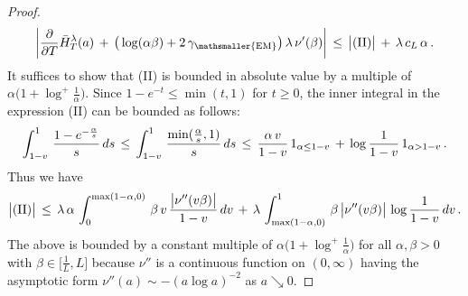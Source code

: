 \documentclass[10pt]{article}
\numberwithin{equation}{section}
\theoremstyle{definition}
\begin{document}
\begin{proof}
\begin{align*}
\bigg| \frac{\partial}{\partial T}\bar{H}_{T}^{\lambda}(a)\,+\,\big( \log (\alpha \beta)+2\,\gamma_{\mathsmaller{\textup{EM}}}    \big)\,\lambda \,\nu'(\beta)   \bigg|\,\leq  \, \big|\textup{(II)}\big|\,+\, \lambda \,c_L\, \alpha \,.
\end{align*}
It suffices to show that (II) is bounded in absolute value by a multiple of $\alpha \big(1+\log^+ \frac{1}{\alpha}\big)$.  Since $1-e^{-t}\leq \min(t,1)  $ for $t\geq 0$, the inner integral in the expression (II) can be bounded as follows:
\begin{align*}
\int_{1-v }^{1  } \,\frac{1-e^{-\frac{\alpha}{s}}  }{s}  \, ds\,\leq \,  \int_{1-v }^{1  }\,\frac{ \textup{min}(\frac{\alpha}{s},1)  }{s} \,  ds   \,\leq \,  \frac{ \alpha  \,v}{1-v }\, 1_{\alpha\leq 1-v  } \,+\,\log \frac{1}{1-v}\,1_{\alpha >1-v }  \,.
\end{align*}
Thus we have 
\begin{align*}
 \big|\textup{(II)}\big|\,\leq \,  \lambda \,\alpha \, \int_0^{\textup{max}(1-\alpha,0)} \,\beta \, v\, \frac{\big|\nu'' ( v \beta)\big|}{1-v} \,   dv \,+\, \lambda \,\int^1_{\textup{max}(1-\alpha,0)} \,\beta \,\big|\nu'' ( v \beta)\big| \,\log\frac{1}{1-v}\,dv\,.
\end{align*}
The above is bounded by a constant multiple of $\alpha \big(1+\log^+ \frac{1}{\alpha}\big)$ for all $\alpha,\beta >0$ with $ \beta\in \big[\frac{1}{L},L\big]  $ because $\nu''$ is a continuous function on $(0,\infty)$ having the asymptotic form $\nu''(a)\sim - ( a\log a )^{-2}$ as $a\searrow 0$. \vspace{.2cm}



\end{proof}
\end{document}
